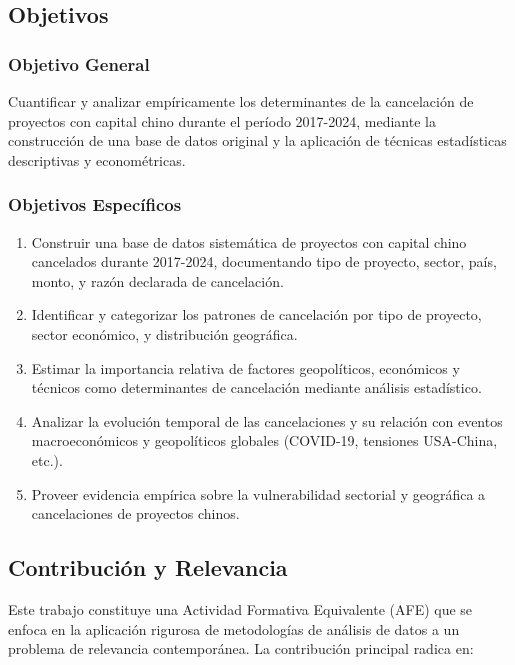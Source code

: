 \documentclass[12pt]{article}
\begin{document}
\subsection{Objetivos}

\subsubsection{Objetivo General}

Cuantificar y analizar empíricamente los determinantes de la cancelación de proyectos con capital chino durante el período 2017-2024, mediante la construcción de una base de datos original y la aplicación de técnicas estadísticas descriptivas y econométricas.

\subsubsection{Objetivos Específicos}

\begin{enumerate}
    \item Construir una base de datos sistemática de proyectos con capital chino cancelados durante 2017-2024, documentando tipo de proyecto, sector, país, monto, y razón declarada de cancelación.
    
    \item Identificar y categorizar los patrones de cancelación por tipo de proyecto, sector económico, y distribución geográfica.
    
    \item Estimar la importancia relativa de factores geopolíticos, económicos y técnicos como determinantes de cancelación mediante análisis estadístico.
    
    \item Analizar la evolución temporal de las cancelaciones y su relación con eventos macroeconómicos y geopolíticos globales (COVID-19, tensiones USA-China, etc.).
    
    \item Proveer evidencia empírica sobre la vulnerabilidad sectorial y geográfica a cancelaciones de proyectos chinos.
\end{enumerate}

\subsection{Contribución y Relevancia}

Este trabajo constituye una Actividad Formativa Equivalente (AFE) que se enfoca en la aplicación rigurosa de metodologías de análisis de datos a un problema de relevancia contemporánea. La contribución principal radica en:
\end{document}
